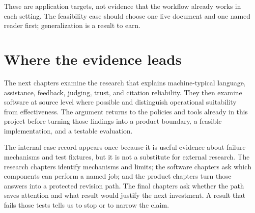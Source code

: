 These are application targets, not evidence that the workflow already works in
each setting. The feasibility case should choose one live document and one
named reader first; generalization is a result to earn.

\section{Where the evidence leads}
\label{sec:route}

The next chapters examine the research that explains machine-typical language,
assistance, feedback, judging, trust, and citation reliability. They then
examine software at source level where possible and distinguish operational
suitability from effectiveness. The argument returns to the policies and tools
already in this project before turning those findings into a product boundary,
a feasible implementation, and a testable evaluation.

The internal case record appears once because it is useful evidence about
failure mechanisms and test fixtures, but it is not a substitute for external
research. The research chapters identify mechanisms and limits; the software
chapters ask which components can perform a named job; and the product chapters
turn those answers into a protected revision path. The final chapters ask
whether the path saves attention and what result would justify the next
investment. A result that fails those tests tells us to stop or to narrow the
claim.
